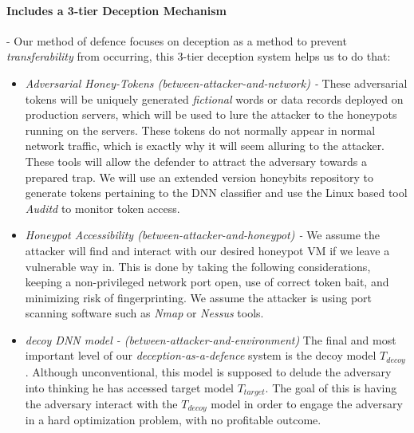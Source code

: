 \documentclass[grad,lot,lof,11pt,oneside,onehalfspace]{RUthesis}
\begin{document}
\paragraph{Includes a 3-tier Deception Mechanism } - Our method of defence focuses on deception as a method to prevent \textit{transferability} from occurring, this 3-tier deception system helps us to do that:
\begin{itemize}
	\item \textit{Adversarial Honey-Tokens (between-attacker-and-network) - }
	These adversarial tokens will be uniquely generated \textit{fictional} words or data records deployed on production servers, which will be used to lure the attacker to the honeypots running on the servers. These tokens do not normally appear in normal network traffic, which is exactly why it will seem alluring to the attacker. 
	These tools will allow the defender to attract the adversary towards a prepared trap. We will use an extended version honeybits \cite{ka_honeybits:_2018}  repository to generate tokens pertaining to the DNN classifier and use the Linux based tool \textit{Auditd} to monitor token access.
	\item \textit{Honeypot Accessibility (between-attacker-and-honeypot) - }
	We assume the attacker will find and interact with our desired honeypot VM if we leave a vulnerable way in. This is done by taking the following considerations, keeping a non-privileged network port open, use of correct token bait, and minimizing risk of fingerprinting. We assume the attacker is using port scanning software such as \textit{Nmap} or \textit{Nessus} tools. 
	\item \textit{decoy DNN model - (between-attacker-and-environment)}
	The final and most important level of our \textit{deception-as-a-defence} system is the decoy model \textit{$T_{decoy}$}. Although unconventional, this model is supposed to delude the adversary into thinking he has accessed target model \textit{$T_{target}$}. The goal of this is having the adversary interact with the \textit{$T_{decoy}$} model in order to engage the adversary in a hard optimization problem, with no profitable outcome. 
\end{itemize}
\end{document}
